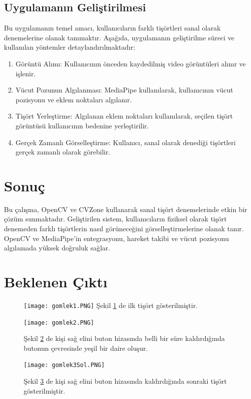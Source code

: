 \documentclass[12pt, a4paper]{article}
\begin{document}
\subsection{Uygulamanın Geliştirilmesi}
Bu uygulamanın temel amacı, kullanıcıların farklı tişörtleri sanal olarak denemelerine olanak tanımaktır. Aşağıda, uygulamanın geliştirilme süreci ve kullanılan yöntemler detaylandırılmaktadır:
\begin{enumerate}
	\item Görüntü Alımı: Kullanıcının önceden kaydedilmiş video görüntüleri alınır ve işlenir.
	\item Vücut Pozunun Algılanması: MediaPipe kullanılarak, kullanıcının vücut pozisyonu ve eklem noktaları algılanır.
	
	\item Tişört Yerleştirme: Algılanan eklem noktaları kullanılarak, seçilen tişört görüntüsü kullanıcının bedenine yerleştirilir.
	\item 	Gerçek Zamanlı Görselleştirme: Kullanıcı, sanal olarak denediği tişörtleri gerçek zamanlı olarak görebilir.
	
	 
\end{enumerate}
\section{Sonuç}
 Bu çalışma, OpenCV ve CVZone kullanarak sanal tişört denemelerinde etkin bir çözüm sunmaktadır. Geliştirilen sistem, kullanıcıların fiziksel olarak tişört denemeden farklı tişörtlerin nasıl görüneceğini görselleştirmelerine olanak tanır. OpenCV ve MediaPipe'in entegrasyonu, hareket takibi ve vücut pozisyonu algılamada yüksek doğruluk sağlar.
 	\section{Beklenen Çıktı}
 
 \newpage
 \begin{figure}[!ht]
 	\caption{}
 	\centering
 	\texttt{[image: gomlek1.PNG]}
 	\label{gomlek1}
 	Şekil \ref{gomlek1} de ilk tişört gösterilmiştir\cite{TisortPackage}.	
 	
 	
 	
 \end{figure}
 
 \begin{figure}[!ht]
 	\caption{}
 	\centering
 	\texttt{[image: gomlek2.PNG]}
 	
 	\label{gomlek2}
 	Şekil \ref{gomlek2} de kişi sağ elini buton hizasında belli bir süre kaldırdığında butonun çevresinde yeşil bir daire oluşur.\cite{TisortPackage}	
 	
 	
 \end{figure}
 \newpage
 \begin{figure}[!ht]
 	\caption{}
 	\centering
 	\texttt{[image: gomlek3Sol.PNG]}
 	
 	\label{gomlek3}
 	Şekil \ref{gomlek3} de kişi sağ elini buton hizasında kaldırdığında sonraki tişört gösterilmiştir\cite{TisortPackage}.	
 \end{figure}
 
\end{document}
